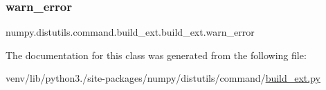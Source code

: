 \subsubsection{\texorpdfstring{warn\+\_\+error}{warn\_error}}
{\footnotesize\ttfamily numpy.\+distutils.\+command.\+build\+\_\+ext.\+build\+\_\+ext.\+warn\+\_\+error}



The documentation for this class was generated from the following file\+:\begin{DoxyCompactItemize}
\item 
venv/lib/python3./site-\/packages/numpy/distutils/command/\hyperlink{numpy_2distutils_2command_2build__ext_8py}{build\+\_\+ext.\+py}\end{DoxyCompactItemize}
